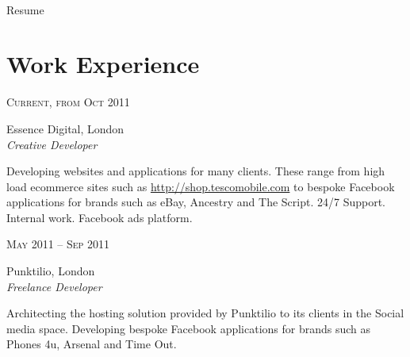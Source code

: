 \documentclass[10pt]{article} %
\begin{document}
\color{text1} %


\par{\\
{\color{headings} Resume\\[15pt]\par}
	

\begin{minipage}[t]{0.5\textwidth}
\vspace{0pt}


\section{Work Experience} 

{\raggedleft\textsc{Current, from Oct 2011}\par}

{\raggedright\large Essence Digital, London\\
\textit{Creative Developer}\\[5pt]}

\normalsize{Developing websites and applications for many clients. These range from high load ecommerce sites such as \href{http://shop.tescomobile.com}{http://shop.tescomobile.com} to bespoke Facebook applications for brands such as eBay, Ancestry and The Script. 24/7 Support. Internal work. Facebook ads platform.}\\

{\raggedleft\textsc{May 2011 -- Sep 2011}\par}

{\raggedright\large Punktilio, London\\
\textit{Freelance Developer}\\[5pt]}

\normalsize{Architecting the hosting solution provided by Punktilio to its clients in the Social media space. Developing bespoke Facebook applications for brands such as Phones 4u, Arsenal and Time Out.}\\


\end{minipage}}
\end{document}
